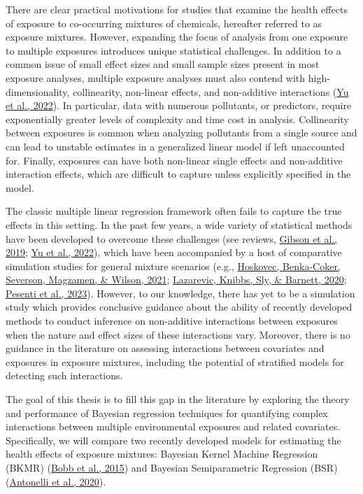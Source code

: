 \documentclass[12pt, twoside]{amherstthesis}
\begin{document}
There are clear practical motivations for studies that examine the health effects of exposure to co-occurring mixtures of chemicals, hereafter referred to as exposure mixtures. However, expanding the focus of analysis from one exposure to multiple exposures introduces unique statistical challenges. In addition to a common issue of small effect sizes and small sample sizes present in most exposure analyses, multiple exposure analyses must also contend with high-dimensionality, collinearity, non-linear effects, and non-additive interactions (\protect\hyperlink{ref-yu_review_2022}{Yu et al., 2022}). In particular, data with numerous pollutants, or predictors, require exponentially greater levels of complexity and time cost in analysis. Collinearity between exposures is common when analyzing pollutants from a single source and can lead to unstable estimates in a generalized linear model if left unaccounted for. Finally, exposures can have both non-linear single effects and non-additive interaction effects, which are difficult to capture unless explicitly specified in the model.

The classic multiple linear regression framework often fails to capture the true effects in this setting. In the past few years, a wide variety of statistical methods have been developed to overcome these challenges (see reviews, \protect\hyperlink{ref-gibson_overview_2019}{Gibson et al., 2019}; \protect\hyperlink{ref-yu_review_2022}{Yu et al., 2022}), which have been accompanied by a host of comparative simulation studies for general mixture scenarios (e.g., \protect\hyperlink{ref-hoskovec_model_2021}{Hoskovec, Benka-Coker, Severson, Magzamen, \& Wilson, 2021}; \protect\hyperlink{ref-lazarevic_performance_2020}{Lazarevic, Knibbs, Sly, \& Barnett, 2020}; \protect\hyperlink{ref-pesenti_comparative_2023}{Pesenti et al., 2023}). However, to our knowledge, there has yet to be a simulation study which provides conclusive guidance about the ability of recently developed methods to conduct inference on non-additive interactions between exposures when the nature and effect sizes of these interactions vary. Moreover, there is no guidance in the literature on assessing interactions between covariates and exposures in exposure mixtures, including the potential of stratified models for detecting such interactions.

The goal of this thesis is to fill this gap in the literature by exploring the theory and performance of Bayesian regression techniques for quantifying complex interactions between multiple environmental exposures and related covariates. Specifically, we will compare two recently developed models for estimating the health effects of exposure mixtures: Bayesian Kernel Machine Regression (BKMR) (\protect\hyperlink{ref-bobb_bayesian_2015}{Bobb et al., 2015}) and Bayesian Semiparametric Regression (BSR) (\protect\hyperlink{ref-antonelli_estimating_2020}{Antonelli et al., 2020}).
\end{document}
